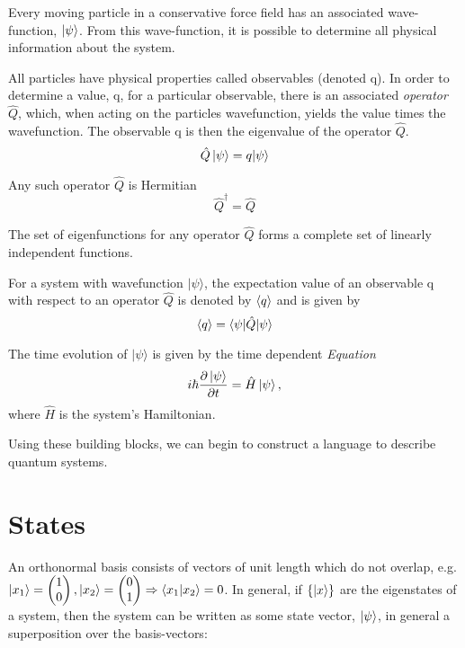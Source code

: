 \begin{postulate}
\item \label{postulate:conservative_force_field} 
    Every moving particle in a conservative force field has an associated wave-function, $\ket{\psi}$. 
    From this wave-function, it is possible to determine all physical information about the system. 
\item \label{postulate:eigenvalues} 
    All particles have physical properties called observables (denoted \gls{q}). 
    In order to determine a value, \gls{q}, for a particular observable, there is an associated \emph{operator} $\hat{Q}$, which, 
        when acting on the particles wavefunction, yields the value times the wavefunction. 
    The observable \gls{q} is then the eigenvalue of the operator $\hat{Q}$.
    \begin{equation}
    \hat{Q} \ket{\psi} = q | \psi \rangle
    \end{equation}
\item \label{postulate:hermiticity}
    Any such operator  $\hat{Q}$ is Hermitian
    \begin{equation}
        \hat{Q}^\dag = \hat{Q}
    \end{equation}
\item \label{postulate:eigenfunction}
    The set of eigenfunctions for any operator $\hat{Q}$ forms a complete set of linearly independent functions.
\item \label{postulate:expectation_values}
    For a system with wavefunction $ | \psi \rangle$, the expectation value of an observable \gls{q}  with respect to an operator $\hat{Q}$ is  denoted by $\langle q \rangle$ and is given by 
    \begin{equation}
    \langle q \rangle = \langle \psi | \hat{Q} | \psi \rangle
    \end{equation}
\item \label{postulate:schrodinger_eqn}
    The time evolution of $ | \psi \rangle$ is given by the time dependent \emph{\schrodinger Equation}
    \begin{equation}
    i \hbar \frac{\partial \ket{\psi}}{\partial t} = \hat{H} \ket{\psi},
    \end{equation}
    where $\hat{H}$ is the system's Hamiltonian.
\end{postulate}
 
Using these building blocks, we can begin to construct a language to describe quantum systems. 

\section{States}\label{sec:states}
An orthonormal basis consists of vectors of unit length which do not overlap, 
    e.g. $\ket{x_1} = \left(\begin{matrix}1 \\ 0 \end{matrix}\right), \ket{x_2} = \left(\begin{matrix}0 \\ 1\end{matrix}\right) \Rightarrow \braket{x_1 | x_2} = 0$. 
In general, if $ \{ \ket{x} \} $ are the eigenstates of a system, then the system can be written as some state vector, $\ket{\psi}$, 
    in general a superposition over the basis-vectors: 


